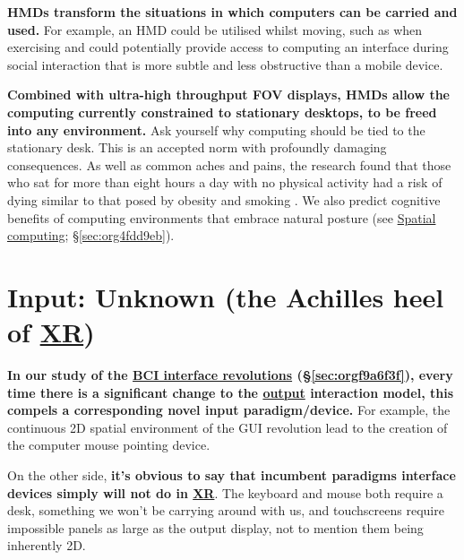 \documentclass[logo,bsc,singlespacing,parskip]{infthesis}
\begin{document}
\textbf{HMDs transform the situations in which computers can be carried and used.}
For example, an HMD could be utilised whilst moving, such as when exercising and could potentially provide access to computing an interface during social interaction that is more subtle and less obstructive than a mobile device.

\textbf{Combined with ultra-high throughput FOV displays, HMDs allow the computing currently constrained to stationary desktops, to be freed into any environment.}
Ask yourself why computing should be tied to the stationary desk.
This is an accepted norm with profoundly damaging consequences.
As well as common aches and pains, the research found that those who sat for more than eight hours a day with no physical activity had a risk of dying similar to that posed by obesity and smoking \autocite{laskowskiSittingRisksHow}.
We also predict cognitive benefits of computing environments that embrace natural posture (see \hyperref[sec:org4fdd9eb]{Spatial computing}; \S \ref{sec:org4fdd9eb}).

\section{Input: Unknown (the Achilles heel of \hyperref[org88b0f70]{XR})}
\label{sec:org9bcda9d}
\textbf{In our study of the \hyperref[sec:orgf9a6f3f]{BCI interface revolutions} (\S \ref{sec:orgf9a6f3f}), every time there is a significant change to the \hyperref[output]{output} interaction model, this compels a corresponding novel input paradigm/device.}
For example, the continuous 2D spatial environment of the GUI revolution lead to the creation of the computer mouse pointing device.

On the other side, \textbf{it's obvious to say that incumbent paradigms interface devices simply will not do in \hyperref[org88b0f70]{XR}}.
The keyboard and mouse both require a desk, something we won't be carrying around with us, and touchscreens require impossible panels as large as the output display, not to mention them being inherently 2D.
\end{document}

